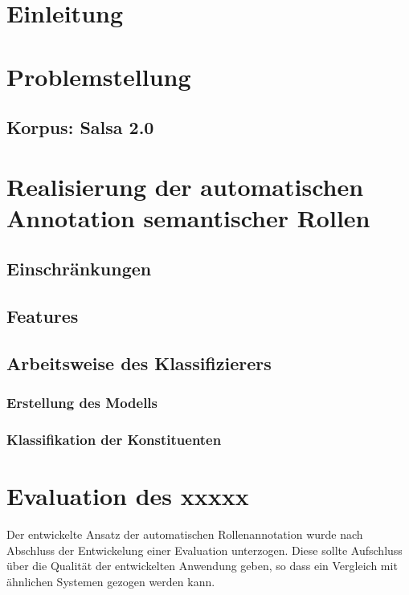 \documentclass[12pt]{article}
\begin{document}
\pagestyle{fancy} %
\fancyhf{} %
\renewcommand{\headrulewidth}{0pt} %
\renewcommand{\footrulewidth}{0pt} %
\fancyfoot[C]{\thepage} %


\newpage
{}

\section{Einleitung}
\section{Problemstellung}
\subsection{Korpus: Salsa 2.0}
\section{Realisierung der automatischen Annotation semantischer Rollen}
\subsection{Einschränkungen}
\subsection{Features}
\subsection{Arbeitsweise des Klassifizierers}
\subsubsection{Erstellung des Modells}
\subsubsection{Klassifikation der Konstituenten}
\section{Evaluation des xxxxx} %

Der entwickelte Ansatz der automatischen Rollenannotation wurde nach Abschluss
der Entwickelung einer Evaluation unterzogen. Diese sollte Aufschluss über die
Qualität der entwickelten Anwendung geben, so dass ein Vergleich mit ähnlichen
Systemen gezogen werden kann.

\newpage


\end{document}
